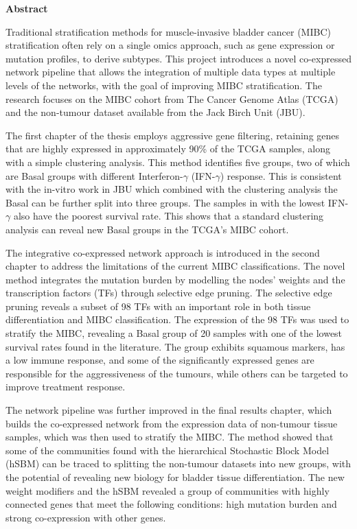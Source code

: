 \thispagestyle{plain}
\begin{center}
    \Large        
    \textbf{Abstract}
    \vspace{0.2cm}
\end{center}


Traditional stratification methods for muscle-invasive bladder cancer (MIBC) stratification often rely on a single omics approach, such as gene expression or mutation profiles, to derive subtypes. This project introduces a novel co-expressed network pipeline that allows the integration of multiple data types at multiple levels of the networks, with the goal of improving MIBC stratification. The research focuses on the MIBC cohort from The Cancer Genome Atlas (TCGA) and the non-tumour dataset available from the Jack Birch Unit (JBU).

The first chapter of the thesis employs aggressive gene filtering, retaining genes that are highly expressed in approximately 90\% of the TCGA samples, along with a simple clustering analysis. This method identifies five groups, two of which are Basal groups with different Interferon-$\gamma$ (IFN-$\gamma$) response. This is consistent with the in-vitro work in JBU which combined with the clustering analysis the Basal can be further split into three groups. The samples in with the lowest IFN-$\gamma$ also have the poorest survival rate. This shows that a standard clustering analysis can reveal new Basal groups in the TCGA's MIBC cohort.

% 
The integrative co-expressed network approach is introduced in the second chapter to address the limitations of the current MIBC classifications. The novel method integrates the mutation burden by modelling the nodes' weights and the transcription factors (TFs) through selective edge pruning. The selective edge pruning reveals a subset of 98 TFs with an important role in both tissue differentiation and MIBC classification. The expression of the 98 TFs was used to stratify the MIBC, revealing a Basal group of 20 samples with one of the lowest survival rates found in the literature. The group exhibits squamous markers, has a low immune response, and some of the significantly expressed genes are responsible for the aggressiveness of the tumours, while others can be targeted to improve treatment response.

%
The network pipeline was further improved in the final results chapter, which builds the co-expressed network from the expression data of non-tumour tissue samples, which was then used to stratify the MIBC. The method showed that some of the communities found with the hierarchical Stochastic Block Model (hSBM) can be traced to splitting the non-tumour datasets into new groups, with the potential of revealing new biology for bladder tissue differentiation. The new weight modifiers and the hSBM revealed a group of communities with highly connected genes that meet the following conditions: high mutation burden and strong co-expression with other genes.

